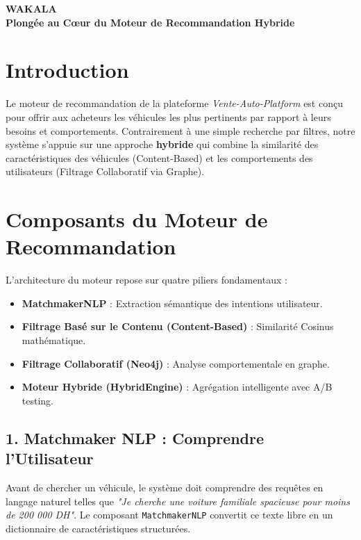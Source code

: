 \documentclass[a4paper, 11pt]{article}
\begin{document}
\begin{center}
    {\Huge \textcolor{primaryBlue}{\textbf{WAKALA}}}\\[0.2cm]
    {\large \bfseries \textcolor{primaryBlue}{Plongée au Cœur du Moteur de Recommandation Hybride}}
\end{center}

\vspace{0.5cm}

\section*{Introduction}
Le moteur de recommandation de la plateforme \textit{Vente-Auto-Platform} est conçu pour offrir aux acheteurs les véhicules les plus pertinents par rapport à leurs besoins et comportements. Contrairement à une simple recherche par filtres, notre système s'appuie sur une approche \textbf{hybride} qui combine la similarité des caractéristiques des véhicules (Content-Based) et les comportements des utilisateurs (Filtrage Collaboratif via Graphe).

\vspace{0.3cm}

\section*{Composants du Moteur de Recommandation}

L'architecture du moteur repose sur quatre piliers fondamentaux :
\begin{itemize}[label=\textbullet]
    \item \textbf{MatchmakerNLP} : Extraction sémantique des intentions utilisateur.
    \item \textbf{Filtrage Basé sur le Contenu (Content-Based)} : Similarité Cosinus mathématique.
    \item \textbf{Filtrage Collaboratif (Neo4j)} : Analyse comportementale en graphe.
    \item \textbf{Moteur Hybride (HybridEngine)} : Agrégation intelligente avec A/B testing.
\end{itemize}

\vspace{0.2cm}

\subsection*{1. Matchmaker NLP : Comprendre l'Utilisateur}
Avant de chercher un véhicule, le système doit comprendre des requêtes en langage naturel telles que \textit{"Je cherche une voiture familiale spacieuse pour moins de 200 000 DH"}.
Le composant \texttt{MatchmakerNLP} convertit ce texte libre en un dictionnaire de caractéristiques structurées.
\end{document}
